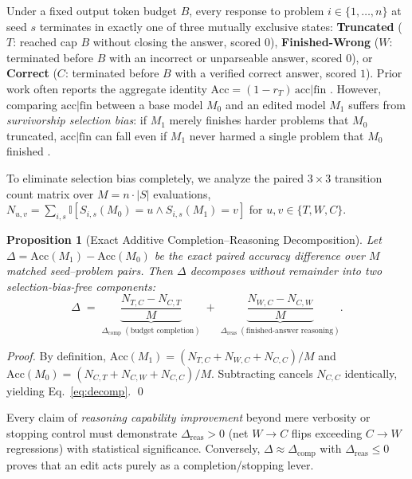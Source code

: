 \documentclass[10pt]{article}
\newtheorem{proposition}{Proposition}
\begin{document}
Under a fixed output token budget $B$, every response to problem $i \in \{1,\dots,n\}$ at seed $s$ terminates in exactly one of three mutually exclusive states: \textbf{Truncated} ($T$: reached cap $B$ without closing the answer, scored $0$), \textbf{Finished-Wrong} ($W$: terminated before $B$ with an incorrect or unparseable answer, scored $0$), or \textbf{Correct} ($C$: terminated before $B$ with a verified correct answer, scored $1$). Prior work often reports the aggregate identity $\mathrm{Acc} = (1 - r_T)\,\mathrm{acc}|\mathrm{fin}$ \citep{kaiser2026beyond,nie2026coupling}. However, comparing $\mathrm{acc}|\mathrm{fin}$ between a base model $M_0$ and an edited model $M_1$ suffers from \emph{survivorship selection bias}: if $M_1$ merely finishes harder problems that $M_0$ truncated, $\mathrm{acc}|\mathrm{fin}$ can fall even if $M_1$ never harmed a single problem that $M_0$ finished \citep{zhou2026conserved}.

To eliminate selection bias completely, we analyze the paired $3\times 3$ transition count matrix over $M = n \cdot |S|$ evaluations, $N_{u,v} = \sum_{i,s}\mathbb{I}[S_{i,s}(M_0)=u \wedge S_{i,s}(M_1)=v]$ for $u,v\in\{T,W,C\}$.

\begin{proposition}[Exact Additive Completion--Reasoning Decomposition]
\label{prop:decomp}
Let $\Delta = \mathrm{Acc}(M_1) - \mathrm{Acc}(M_0)$ be the exact paired accuracy difference over $M$ matched seed--problem pairs. Then $\Delta$ decomposes without remainder into two selection-bias-free components:
\begin{equation}
\label{eq:decomp}
\Delta \;=\; \underbrace{\frac{N_{T,C} - N_{C,T}}{M}}_{\displaystyle \Delta_{\mathrm{comp}}\;(\text{budget completion})} \;+\; \underbrace{\frac{N_{W,C} - N_{C,W}}{M}}_{\displaystyle \Delta_{\mathrm{reas}}\;(\text{finished-answer reasoning})}.
\end{equation}
\end{proposition}

\noindent\emph{Proof.} By definition, $\mathrm{Acc}(M_1) = (N_{T,C}+N_{W,C}+N_{C,C})/M$ and $\mathrm{Acc}(M_0) = (N_{C,T}+N_{C,W}+N_{C,C})/M$. Subtracting cancels $N_{C,C}$ identically, yielding Eq.~\eqref{eq:decomp}. \qed

Every claim of \emph{reasoning capability improvement} beyond mere verbosity or stopping control must demonstrate $\Delta_{\mathrm{reas}} > 0$ (net $W\!\to\!C$ flips exceeding $C\!\to\!W$ regressions) with statistical significance. Conversely, $\Delta \approx \Delta_{\mathrm{comp}}$ with $\Delta_{\mathrm{reas}} \le 0$ proves that an edit acts purely as a completion/stopping lever.
\end{document}
